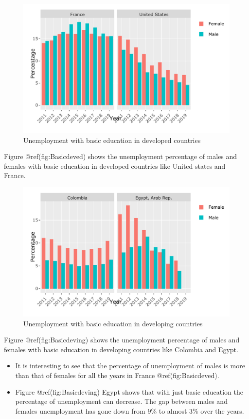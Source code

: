 \documentclass[
]{article}
\begin{document}
\begin{figure}
\centering
\includegraphics{The_Outsiders_5513_files/figure-latex/Basicdeved-1.pdf}
\caption{Unemployment with basic education in developed countries}
\end{figure}

Figure @ref(fig:Basicdeved) shows the unemployment percentage of males
and females with basic education in developed countries like United
states and France.

\begin{figure}
\centering
\includegraphics{The_Outsiders_5513_files/figure-latex/Basicdeving-1.pdf}
\caption{Unemployment with basic education in developing countries}
\end{figure}

Figure @ref(fig:Basicdeving) shows the unemployment percentage of males
and females with basic education in developing countries like Colombia
and Egypt.

\begin{itemize}
\item
  It is interesting to see that the percentage of unemployment of males
  is more than that of females for all the years in France
  @ref(fig:Basicdeved).
\item
  Figure @ref(fig:Basicdeving) Egypt shows that with just basic
  education the percentage of unemployment can decrease. The gap between
  males and females unemployment has gone down from 9\% to almost 3\%
  over the years.
\end{itemize}
\end{document}
